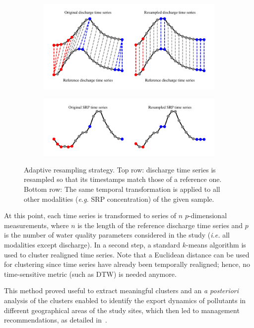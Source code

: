 \begin{figure}[t]
    \begin{subfigure}[b]{\textwidth}
         \centering
         \includegraphics[width=.6\textwidth]{fig/dtw_da}
     \end{subfigure}
      \begin{subfigure}[b]{\textwidth}
           \centering
           \includegraphics[width=.6\textwidth]{fig/dtw_da_b}
       \end{subfigure}
    \caption{Adaptive resampling strategy. Top row: discharge time series is
    resampled so that its timestamps match those of a reference one. Bottom row:
    The same temporal transformation is applied to all other modalities
    (\emph{e.g.} SRP concentration) of the given sample.}
    \label{fig:dtw_da}
\end{figure}

At this point, each time series is transformed to series of $n$
$p$-dimensional measurements, where $n$ is the length of the
reference discharge time series and $p$ is the number of water quality
parameters considered in the study (\emph{i.e.} all modalities except discharge).
In a second step, a standard $k$-means algorithm is used to cluster
realigned time series.
Note that a Euclidean distance can be used for clustering since time series
have already been temporally realigned; hence, no time-sensitive metric (such as
DTW) is needed anymore.

This method proved useful to extract meaningful clusters and an \emph{a posteriori}
analysis of the clusters enabled to identify the export dynamics of pollutants
in different geographical areas of the study sites, which then led to management
recommendations, as detailed in~\cite{dupas:halshs-01228397}.
